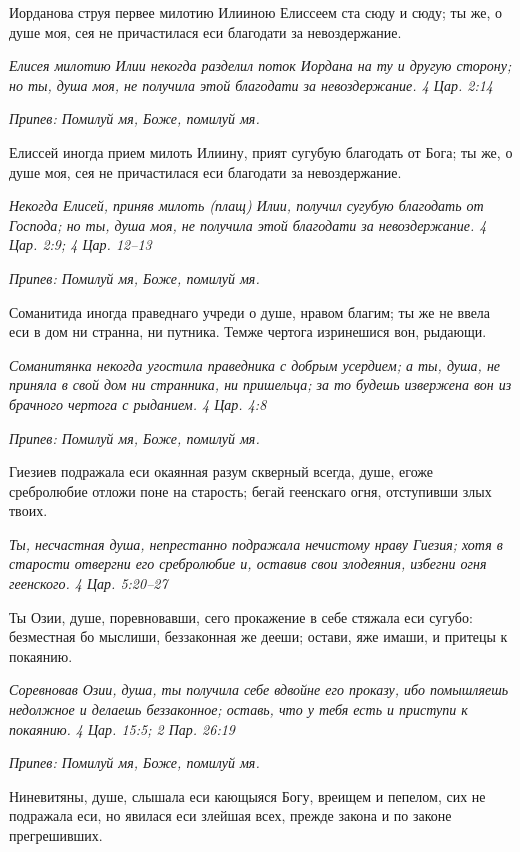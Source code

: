 Иорданова струя первее милотию Илииною Елиссеем ста сюду и сюду; ты же, о душе моя, сея не причастилася еси благодати за невоздержание.


\itshape Елисея милотию Илии некогда разделил поток Иордана на ту и другую сторону; но ты, душа моя, не получила этой благодати за невоздержание. 4 Цар. 2:14\normalfont{}


\itshape Припев:\normalfont{} Помилуй мя, Боже, помилуй мя.


Елиссей иногда прием милоть Илиину, прият сугубую благодать от Бога; ты же, о душе моя, сея не причастилася еси благодати за невоздержание.


\itshape Некогда Елисей, приняв милоть (плащ) Илии, получил сугубую благодать от Господа; но ты, душа моя, не получила этой благодати за невоздержание. 4 Цар. 2:9; 4 Цар. 12–13\normalfont{}


\itshape Припев:\normalfont{} Помилуй мя, Боже, помилуй мя.


Соманитида иногда праведнаго учреди о душе, нравом благим; ты же не ввела еси в дом ни странна, ни путника. Темже чертога изринешися вон, рыдающи.


\itshape Соманитянка некогда угостила праведника с добрым усердием; а ты, душа, не приняла в свой дом ни странника, ни пришельца; за то будешь извержена вон из брачного чертога с рыданием. 4 Цар. 4:8\normalfont{}


\itshape Припев:\normalfont{} Помилуй мя, Боже, помилуй мя.


Гиезиев подражала еси окаянная разум скверный всегда, душе, егоже сребролюбие отложи поне на старость; бегай геенскаго огня, отступивши злых твоих.


\itshape Ты, несчастная душа, непрестанно подражала нечистому нраву Гиезия; хотя в старости отвергни его сребролюбие и, оставив свои злодеяния, избегни огня геенского. 4 Цар. 5:20–27\normalfont{}


Ты Озии, душе, поревновавши, сего прокажение в себе стяжала еси сугубо: безместная бо мыслиши, беззаконная же дееши; остави, яже имаши, и притецы к покаянию.


\itshape Соревновав Озии, душа, ты получила себе вдвойне его проказу, ибо помышляешь недолжное и делаешь беззаконное; оставь, что у тебя есть и приступи к покаянию. 4 Цар. 15:5; 2 Пар. 26:19\normalfont{}


\itshape Припев:\normalfont{} Помилуй мя, Боже, помилуй мя.


Ниневитяны, душе, слышала еси кающыяся Богу, вреищем и пепелом, сих не подражала еси, но явилася еси злейшая всех, прежде закона и по законе прегрешивших.


